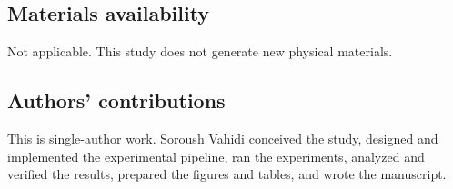 \documentclass[pdflatex,sn-basic,Numbered]{sn-jnl}
\begin{document}
\subsection*{Materials availability}
Not applicable. This study does not generate new physical materials.

\subsection*{Authors' contributions}
This is single-author work. Soroush Vahidi conceived the study, designed
and implemented the experimental pipeline, ran the experiments, analyzed
and verified the results, prepared the figures and tables, and wrote the
manuscript.


\end{document}
